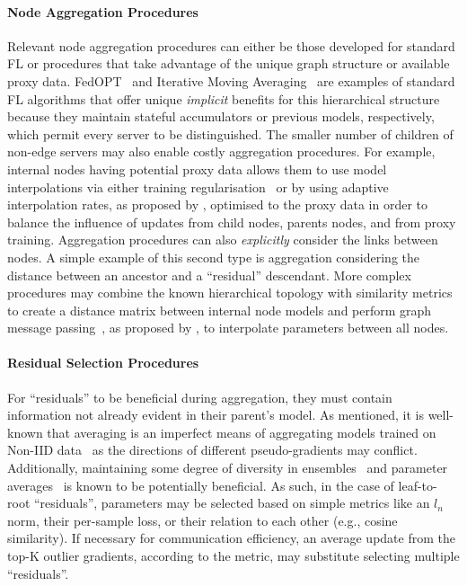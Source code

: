 \paragraph{Node Aggregation Procedures} Relevant node aggregation procedures can either be those developed for standard FL or procedures that take advantage of the unique graph structure or available proxy data. FedOPT~\citep{FedOPT} and Iterative Moving Averaging~\citep{UnderstandingModelAveragingInFL} are examples of standard FL algorithms that offer unique \emph{implicit} benefits for this hierarchical structure because they maintain stateful accumulators or previous models, respectively, which permit every server to be distinguished. The smaller number of children of non-edge servers may also enable costly aggregation procedures.  For example, internal nodes having potential proxy data allows them to use model interpolations via either training regularisation~\citep{Ditto} or by using adaptive interpolation rates, as proposed by \citet{AdaptivePersonalisedFederatedLearning}, optimised to the proxy data in order to balance the influence of updates from child nodes, parents nodes, and
from proxy training. Aggregation procedures can also \emph{explicitly} consider the links between nodes. A simple example of this second type is aggregation considering the distance between an ancestor and a ``residual'' descendant. More complex procedures may combine the known hierarchical topology with similarity metrics to create a distance matrix between internal node models and perform graph message passing~\citep{GNNSurvey}, as proposed by \citet{FederatedLearningWithGraph}, to interpolate parameters between all nodes.
\paragraph{Residual Selection Procedures} For ``residuals'' to be beneficial during aggregation, they must contain information not already evident in their parent's model. As mentioned, it is well-known that averaging is an imperfect means of aggregating models trained on Non-IID data~\citep{FedAvg,LargeCohorts,OnTheConvergenceOfFedAvgOnNonIIDdata,FedProx} as the directions of different pseudo-gradients may conflict. Additionally, maintaining some degree of diversity in ensembles~\citep{StochasticMultipleChoiceLearningDiverseEnsembles} and parameter averages~\citep{DiverseWeightAveraging} is known to be potentially beneficial. As such, in the case of leaf-to-root ``residuals'', parameters may be selected based on simple metrics like an $l_n$ norm, their per-sample loss, or their relation to each other (e.g., cosine similarity). If necessary for communication efficiency, an average update from the top-K outlier gradients, according to the metric, may substitute selecting multiple ``residuals''.
